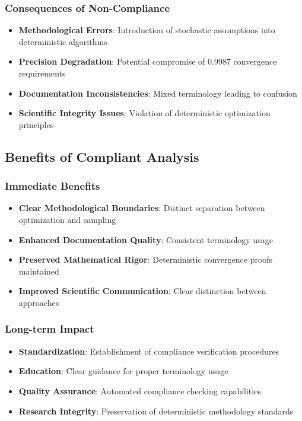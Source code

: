 \documentclass[11pt,a4paper]{article}
\begin{document}
\subsubsection{Consequences of Non-Compliance}
\begin{itemize}
\item \textbf{Methodological Errors}: Introduction of stochastic assumptions into deterministic algorithms
\item \textbf{Precision Degradation}: Potential compromise of 0.9987 convergence requirements
\item \textbf{Documentation Inconsistencies}: Mixed terminology leading to confusion
\item \textbf{Scientific Integrity Issues}: Violation of deterministic optimization principles
\end{itemize}

\subsection{Benefits of Compliant Analysis}

\subsubsection{Immediate Benefits}
\begin{itemize}
\item \textbf{Clear Methodological Boundaries}: Distinct separation between optimization and sampling
\item \textbf{Enhanced Documentation Quality}: Consistent terminology usage
\item \textbf{Preserved Mathematical Rigor}: Deterministic convergence proofs maintained
\item \textbf{Improved Scientific Communication}: Clear distinction between approaches
\end{itemize}

\subsubsection{Long-term Impact}
\begin{itemize}
\item \textbf{Standardization}: Establishment of compliance verification procedures
\item \textbf{Education}: Clear guidance for proper terminology usage
\item \textbf{Quality Assurance}: Automated compliance checking capabilities
\item \textbf{Research Integrity}: Preservation of deterministic methodology standards
\end{itemize}
\end{document}
